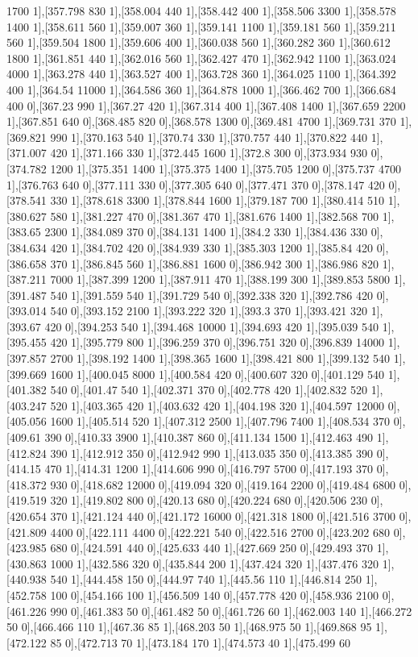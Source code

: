 {1700 1],[357.798 830 1],[358.004 440 1],[358.442 400 1],[358.506 3300 1],[358.578 1400 1],[358.611 560 1],[359.007 360 1],[359.141 1100 1],[359.181 560 1],[359.211 560 1],[359.504 1800 1],[359.606 400 1],[360.038 560 1],[360.282 360 1],[360.612 1800 1],[361.851 440 1],[362.016 560 1],[362.427 470 1],[362.942 1100 1],[363.024 4000 1],[363.278 440 1],[363.527 400 1],[363.728 360 1],[364.025 1100 1],[364.392 400 1],[364.54 11000 1],[364.586 360 1],[364.878 1000 1],[366.462 700 1],[366.684 400 0],[367.23 990 1],[367.27 420 1],[367.314 400 1],[367.408 1400 1],[367.659 2200 1],[367.851 640 0],[368.485 820 0],[368.578 1300 0],[369.481 4700 1],[369.731 370 1],[369.821 990 1],[370.163 540 1],[370.74 330 1],[370.757 440 1],[370.822 440 1],[371.007 420 1],[371.166 330 1],[372.445 1600 1],[372.8 300 0],[373.934 930 0],[374.782 1200 1],[375.351 1400 1],[375.375 1400 1],[375.705 1200 0],[375.737 4700 1],[376.763 640 0],[377.111 330 0],[377.305 640 0],[377.471 370 0],[378.147 420 0],[378.541 330 1],[378.618 3300 1],[378.844 1600 1],[379.187 700 1],[380.414 510 1],[380.627 580 1],[381.227 470 0],[381.367 470 1],[381.676 1400 1],[382.568 700 1],[383.65 2300 1],[384.089 370 0],[384.131 1400 1],[384.2 330 1],[384.436 330 0],[384.634 420 1],[384.702 420 0],[384.939 330 1],[385.303 1200 1],[385.84 420 0],[386.658 370 1],[386.845 560 1],[386.881 1600 0],[386.942 300 1],[386.986 820 1],[387.211 7000 1],[387.399 1200 1],[387.911 470 1],[388.199 300 1],[389.853 5800 1],[391.487 540 1],[391.559 540 1],[391.729 540 0],[392.338 320 1],[392.786 420 0],[393.014 540 0],[393.152 2100 1],[393.222 320 1],[393.3 370 1],[393.421 320 1],[393.67 420 0],[394.253 540 1],[394.468 10000 1],[394.693 420 1],[395.039 540 1],[395.455 420 1],[395.779 800 1],[396.259 370 0],[396.751 320 0],[396.839 14000 1],[397.857 2700 1],[398.192 1400 1],[398.365 1600 1],[398.421 800 1],[399.132 540 1],[399.669 1600 1],[400.045 8000 1],[400.584 420 0],[400.607 320 0],[401.129 540 1],[401.382 540 0],[401.47 540 1],[402.371 370 0],[402.778 420 1],[402.832 520 1],[403.247 520 1],[403.365 420 1],[403.632 420 1],[404.198 320 1],[404.597 12000 0],[405.056 1600 1],[405.514 520 1],[407.312 2500 1],[407.796 7400 1],[408.534 370 0],[409.61 390 0],[410.33 3900 1],[410.387 860 0],[411.134 1500 1],[412.463 490 1],[412.824 390 1],[412.912 350 0],[412.942 990 1],[413.035 350 0],[413.385 390 0],[414.15 470 1],[414.31 1200 1],[414.606 990 0],[416.797 5700 0],[417.193 370 0],[418.372 930 0],[418.682 12000 0],[419.094 320 0],[419.164 2200 0],[419.484 6800 0],[419.519 320 1],[419.802 800 0],[420.13 680 0],[420.224 680 0],[420.506 230 0],[420.654 370 1],[421.124 440 0],[421.172 16000 0],[421.318 1800 0],[421.516 3700 0],[421.809 4400 0],[422.111 4400 0],[422.221 540 0],[422.516 2700 0],[423.202 680 0],[423.985 680 0],[424.591 440 0],[425.633 440 1],[427.669 250 0],[429.493 370 1],[430.863 1000 1],[432.586 320 0],[435.844 200 1],[437.424 320 1],[437.476 320 1],[440.938 540 1],[444.458 150 0],[444.97 740 1],[445.56 110 1],[446.814 250 1],[452.758 100 0],[454.166 100 1],[456.509 140 0],[457.778 420 0],[458.936 2100 0],[461.226 990 0],[461.383 50 0],[461.482 50 0],[461.726 60 1],[462.003 140 1],[466.272 50 0],[466.466 110 1],[467.36 85 1],[468.203 50 1],[468.975 50 1],[469.868 95 1],[472.122 85 0],[472.713 70 1],[473.184 170 1],[474.573 40 1],[475.499 60 }

